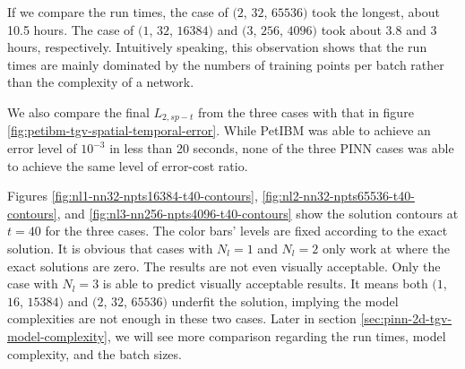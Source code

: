 If we compare the run times, the case of $(2$, $32$, $65536)$ took the longest, about 10.5 hours.
The case of $(1$, $32$, $16384)$ and $(3$, $256$, $4096)$ took about 3.8 and 3 hours, respectively.
Intuitively speaking, this observation shows that the run times are mainly dominated by the numbers of training points per batch rather than the complexity of a network.

We also compare the final $L_{2,sp-t}$ from the three cases with that in figure \ref{fig:petibm-tgv-spatial-temporal-error}.
While PetIBM was able to achieve an error level of $10^{-3}$ in less than 20 seconds, none of the three PINN cases was able to achieve the same level of error-cost ratio.

Figures \ref{fig:nl1-nn32-npts16384-t40-contours}, \ref{fig:nl2-nn32-npts65536-t40-contours}, and \ref{fig:nl3-nn256-npts4096-t40-contours} show the solution contours at $t=40$ for the three cases.
The color bars' levels are fixed according to the exact solution.
It is obvious that cases with $N_l=1$ and $N_l=2$ only work at where the exact solutions are zero.
The results are not even visually acceptable.
Only the case with $N_l=3$ is able to predict visually acceptable results.
It means both $(1$, $16$, $15384)$ and $(2$, $32$, $65536)$ underfit the solution, implying the model complexities are not enough in these two cases.
Later in section \ref{sec:pinn-2d-tgv-model-complexity}, we will see more comparison regarding the run times, model complexity, and the batch sizes.
